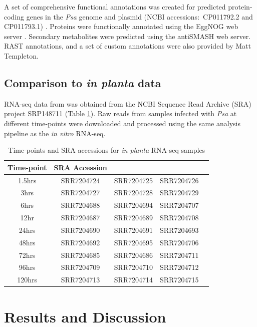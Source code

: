 A set of comprehensive functional annotations was created for predicted protein-coding genes in the \textit{Psa} genome and plasmid (NCBI accessions$:$ CP011792.2 and CP011793.1) \citep{Templeton2015-ma}. Proteins were functionally annotated using the EggNOG web server \citep{Huerta-Cepas2017-xmpx}. Secondary metabolites were predicted using the antiSMASH web server\citep{Medema2011-ub}. RAST \citep{Aziz2008-eh} annotations, and a set of custom annotations were also provided by Matt Templeton.

\subsection{Comparison to \textit{in planta} data}
RNA-seq data from \cite{McAtee2018-sl} was obtained from the NCBI Sequence Read Archive (SRA) project SRP148711 (Table \ref{table:1}). Raw reads from samples infected with \textit{Psa} at different time-points were downloaded and processed using the same analysis pipeline as the \textit{in vitro} RNA-seq.
\begin{table}[H]
\footnotesize
    \centering
    \begin{tabular}{ccccc}\toprule
Time-point & SRA Accession \\\midrule
1.5hrs & SRR7204724 & SRR7204725 & SRR7204726 \\
3hrs & SRR7204727 & SRR7204728 & SRR7204729 \\
6hrs & SRR7204688 & SRR7204694 & SRR7204707 \\
12hr & SRR7204687 & SRR7204689 & SRR7204708 \\
24hrs & SRR7204690 & SRR7204691 & SRR7204693 \\
48hrs & SRR7204692 & SRR7204695 & SRR7204706 \\
72hrs & SRR7204685 & SRR7204686 & SRR7204711 \\
96hrs & SRR7204709 & SRR7204710 & SRR7204712 \\
120hrs & SRR7204713 & SRR7204714 & SRR7204715 \\
        \bottomrule
    \end{tabular}
    \caption[\textit{In planta} RNA-seq samples]{Time-points and SRA accessions for \textit{in planta} RNA-seq samples}
    \label{table:1}
\end{table}

\section{Results and Discussion}

